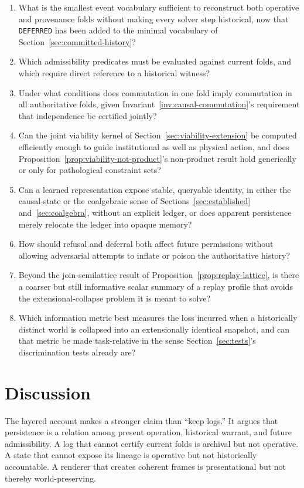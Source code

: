 \documentclass[11pt]{article}
\begin{document}
\begin{enumerate}
\item What is the smallest event vocabulary sufficient to reconstruct both operative and provenance folds without making every solver step historical, now that \texttt{DEFERRED} has been added to the minimal vocabulary of Section~\ref{sec:committed-history}?
\item Which admissibility predicates must be evaluated against current folds, and which require direct reference to a historical witness?
\item Under what conditions does commutation in one fold imply commutation in all authoritative folds, given Invariant~\ref{inv:causal-commutation}'s requirement that independence be certified jointly?
\item Can the joint viability kernel of Section~\ref{sec:viability-extension} be computed efficiently enough to guide institutional as well as physical action, and does Proposition~\ref{prop:viability-not-product}'s non-product result hold generically or only for pathological constraint sets?
\item Can a learned representation expose stable, queryable identity, in either the causal-state or the coalgebraic sense of Sections~\ref{sec:established} and~\ref{sec:coalgebra}, without an explicit ledger, or does apparent persistence merely relocate the ledger into opaque memory?
\item How should refusal and deferral both affect future permissions without allowing adversarial attempts to inflate or poison the authoritative history?
\item Beyond the join-semilattice result of Proposition~\ref{prop:replay-lattice}, is there a coarser but still informative scalar summary of a replay profile that avoids the extensional-collapse problem it is meant to solve?
\item Which information metric best measures the loss incurred when a historically distinct world is collapsed into an extensionally identical snapshot, and can that metric be made task-relative in the sense Section~\ref{sec:tests}'s discrimination tests already are?
\end{enumerate}

\section{Discussion}
\label{sec:discussion}

The layered account makes a stronger claim than ``keep logs.'' It argues that persistence is a relation among present operation, historical warrant, and future admissibility. A log that cannot certify current folds is archival but not operative. A state that cannot expose its lineage is operative but not historically accountable. A renderer that creates coherent frames is presentational but not thereby world-preserving.
\end{document}
